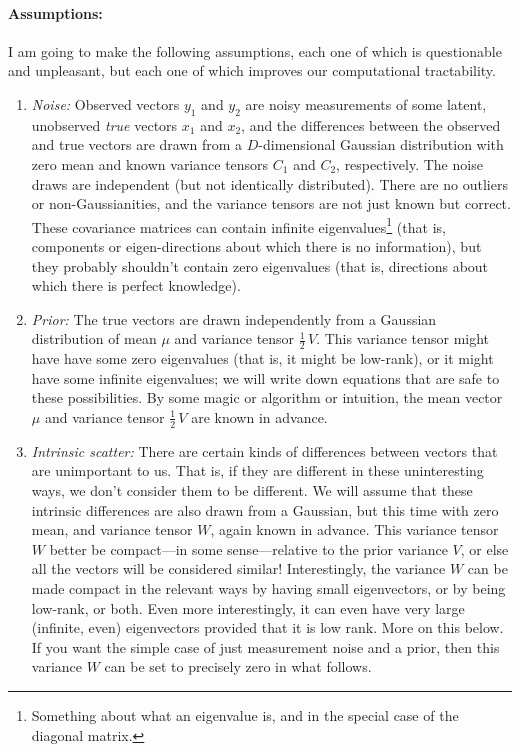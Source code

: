 \documentclass[12pt,letterpaper]{article}
\begin{document}
\paragraph{Assumptions:}
I am going to make the following assumptions, each one of which is
questionable and unpleasant, but each one of which improves our
computational tractability.
\begin{enumerate}\itemsep0ex
\item \emph{Noise:} Observed vectors $y_1$ and $y_2$ are noisy
  measurements of some latent, unobserved \emph{true} vectors $x_1$
  and $x_2$, and the differences between the observed and true vectors
  are drawn from a $D$-dimensional Gaussian distribution with zero
  mean and known variance tensors $C_1$ and $C_2$, respectively. The
  noise draws are independent (but not identically distributed). There
  are no outliers or non-Gaussianities, and the variance tensors are
  not just known but correct. These covariance matrices can contain
  infinite eigenvalues\footnote{Something about what an eigenvalue is,
    and in the special case of the diagonal matrix.} (that is,
  components or eigen-directions about which there is no information),
  but they probably shouldn't contain zero eigenvalues (that is,
  directions about which there is perfect knowledge).
\item \emph{Prior:} The true vectors are drawn independently from a
  Gaussian distribution of mean $\mu$ and variance tensor $\frac{1}{2}\,V$. This
  variance tensor might have have some zero eigenvalues (that is, it
  might be low-rank), or it might have some infinite eigenvalues; we
  will write down equations that are safe to these possibilities. By
  some magic or algorithm or intuition, the mean vector $\mu$ and
  variance tensor $\frac{1}{2}\,V$ are known in advance.
\item \emph{Intrinsic scatter:} There are certain kinds of differences
  between vectors that are unimportant to us. That is, if they are
  different in these uninteresting ways, we don't consider them to be
  different. We will assume that these intrinsic differences are also
  drawn from a Gaussian, but this time with zero mean, and variance
  tensor $W$, again known in advance. This variance tensor $W$ better
  be compact---in some sense---relative to the prior variance $V$, or
  else all the vectors will be considered similar! Interestingly, the
  variance $W$ can be made compact in the relevant ways by having
  small eigenvectors, or by being low-rank, or both. Even more
  interestingly, it can even have very large (infinite, even)
  eigenvectors provided that it is low rank. More on this below.
  If you want the simple case of just measurement noise and a prior,
  then this variance $W$ can be set to precisely zero in what follows.
\end{enumerate}
\end{document}
